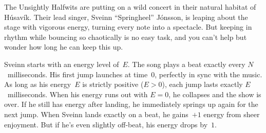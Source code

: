 


The Unsightly Halfwits are putting on a wild concert in their natural habitat of Húsavík.
Their lead singer, Sveinn “Springheel” Jónsson, is leaping about the stage with vigorous energy, 
turning every note into a spectacle.
But keeping in rhythm while bouncing so chaotically is no easy task, and you can’t help but wonder 
how long he can keep this up.

Sveinn starts with an energy level of~$E$.
The song plays a beat exactly every $N$~milliseconds.
His first jump launches at time~$0$, perfectly in sync with the music. As long as his energy~$E$ is strictly positive ($E>0$), each jump lasts exactly $E$~milliseconds.
When his energy runs out with $E=0$, he collapses and the show is over. If he still has energy after landing, he immediately springs up again for the next jump.
When Sveinn lands exactly on a beat, he gains~$+1$ energy from sheer enjoyment.
But if he’s even slightly off-beat, his energy drops by~$1$.

